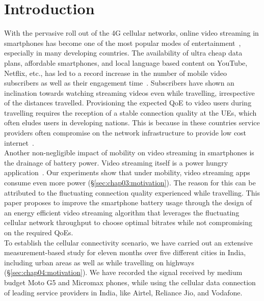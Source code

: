 \section{\textbf{Introduction}}\label{sec:chap03:intro}
With the pervasive roll out of the \ac{4G} cellular networks, online video streaming in smartphones has become one of the most popular modes of entertainment~\cite{CISCO2019}, especially in many developing countries. The availability of ultra cheap data plans, affordable smartphones, and local language based content on YouTube, Netflix, etc., has led to a record increase in the number of mobile video subscribers as well as their engagement time~\cite{Mobstat_2019}.  Subscribers have  shown an inclination towards watching streaming videos even while travelling, irrespective of the distances travelled. Provisioning the expected \ac{QoE} to video users during travelling requires the reception of a stable connection quality at the \acp{UE}, which often eludes users in developing nations. This is because in these countries service providers often compromise on the network infrastructure to provide low cost internet~\cite{Poor_Inf_2019_2}. \\
\indent Another non-negligible impact of mobility on video streaming in  smartphones is the drainage of battery power.  Video streaming itself is a power hungry application~\cite{Xin2012}. Our experiments show that under mobility, video streaming apps consume even more power (\S\ref{sec:chap03:motivation}). The reason for this can be attributed to the fluctuating connection quality experienced while travelling.  This paper proposes to improve the smartphone battery usage through the design of an energy efficient video streaming algorithm that leverages the fluctuating cellular network throughput to choose optimal bitrates while not compromising on the required \ac{QoE}s. \\
\indent To establish the cellular connectivity scenario, 
we have carried out an extensive measurement-based study for eleven months over five different cities in India, including urban areas as well as while travelling on highways (\S\ref{sec:chap04:motivation}). We have recorded the signal received by  medium budget Moto G5 and Micromax phones, while using the cellular data connection of leading service providers in India, like Airtel, Reliance Jio, and Vodafone.
